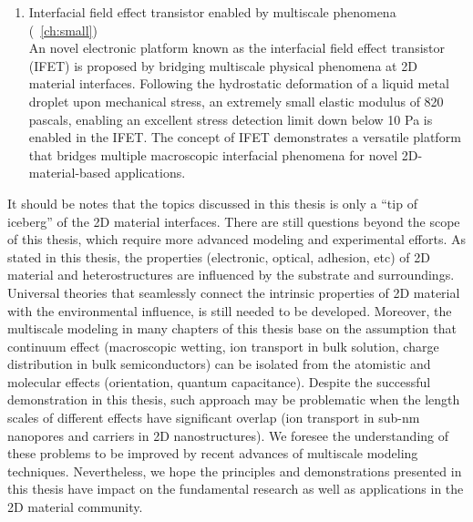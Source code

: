 \begin{enumerate}
\item Interfacial field effect transistor enabled by multiscale phenomena (~\autoref{ch:small})\\
  An novel electronic platform known as the interfacial field effect
  transistor (IFET) is proposed by bridging multiscale physical
  phenomena at 2D material interfaces. Following the hydrostatic
  deformation of a liquid metal droplet upon mechanical stress, an
  extremely small elastic modulus of 820 pascals, enabling an
  excellent stress detection limit down below 10 Pa is enabled in the
  IFET. The concept of IFET demonstrates a versatile platform that
  bridges multiple macroscopic interfacial phenomena for novel
  2D-material-based applications.
\end{enumerate}

It should be notes that the topics discussed in this thesis is only a
``tip of iceberg'' of the 2D material interfaces. There are still
questions beyond the scope of this thesis, which require more advanced
modeling and experimental efforts.
% 
As stated in this thesis, the properties (electronic, optical,
adhesion, etc) of 2D material and heterostructures are influenced by
the substrate and surroundings. Universal theories that seamlessly
connect the intrinsic properties of 2D material with the environmental
influence, is still needed to be developed. Moreover, the multiscale
modeling in many chapters of this thesis base on the assumption that
continuum effect (\eg macroscopic wetting, ion transport in bulk
solution, charge distribution in bulk semiconductors) can be isolated
from the atomistic and molecular effects (\eg orientation, quantum
capacitance). Despite the successful demonstration in this thesis,
such approach may be problematic when the length scales of different
effects have significant overlap (\eg ion transport in sub-nm
nanopores and carriers in 2D nano\-structures). We foresee the
understanding of these problems to be improved by recent advances of
multiscale modeling techniques.  Nevertheless, we hope the principles
and demonstrations presented in this thesis have impact on the
fundamental research as well as applications in the 2D material
community.



